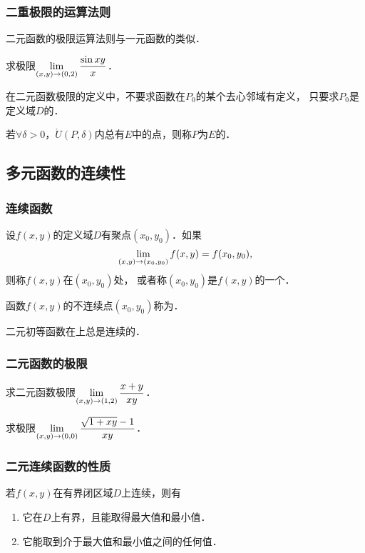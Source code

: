\documentclass[14pt,notheorems,leqno,xcolor={rgb}]{beamer} %
\begin{document}
\begin{frame}
\frametitle{二重极限的运算法则}
\begin{remark*}
二元函数的极限运算法则与一元函数的类似．
\end{remark*}
\vpause
\begin{example}
求极限$\lim\limits_{(x,y)\to(0,2)}\dfrac{\sin{xy}}{x}$．
\end{example}
\vpause\cdotfill
\begin{remark*}
在二元函数极限的定义中，不要求函数在$P_0$的某个去心邻域有定义，
只要求$P_0$是定义域$D$的．
\end{remark*}
\vpause
\begin{definition*}
若$\forall\delta>0$，$\mathring{U}(P,\delta)$内总有$E$中的点，则称$P$为$E$的．
\end{definition*}
\end{frame}

\subsection{多元函数的连续性}

\begin{frame}
\frametitle{连续函数}
\begin{definition}
设$f(x,y)$的定义域$D$有聚点$(x_0,y_0)$．如果
$$\lim\limits_{(x,y)\to(x_0,y_0)}f(x,y)=f(x_0,y_0),$$
则称$f(x,y)$在$(x_0,y_0)$处，
或者称$(x_0,y_0)$是$f(x,y)$的一个．
\end{definition}
\vpause
\begin{remark*}
函数$f(x,y)$的不连续点$(x_0,y_0)$称为．
\end{remark*}
\vpause
\begin{property}
二元初等函数在上总是连续的．
\end{property}
\end{frame}

\begin{frame}
\frametitle{二元函数的极限}
\begin{example}
求二元函数极限$\lim\limits_{(x,y)\to(1,2)}\dfrac{x+y}{xy}$．
\end{example}
\vpause
\begin{example}
求极限$\lim\limits_{(x,y)\to(0,0)}\dfrac{\sqrt{1+xy}-1}{xy}$．
\end{example}
\end{frame}

\begin{frame}
\frametitle{二元连续函数的性质}
\begin{property}
若$f(x,y)$在有界闭区域$D$上连续，则有
\begin{enumerate}
  \item 它在$D$上有界，且能取得最大值和最小值．
  \item 它能取到介于最大值和最小值之间的任何值．
\end{enumerate}
\end{property}
\end{frame}
\end{document}
